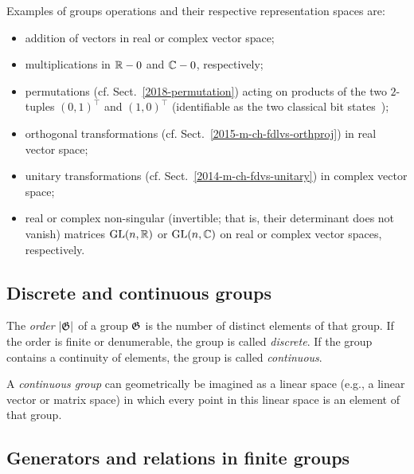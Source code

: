 {
\color{blue}
\bexample
Examples of groups operations and their respective representation spaces are:
\begin{itemize}
\item
addition of vectors in real or complex vector space;

\item
multiplications in ${\Bbb R} - {0}$ and ${\Bbb C} - {0}$, respectively;

\item
permutations (cf. Sect.~\ref{2018-permutation})
acting on products of the two $2$-tuples
$(0,1)^\intercal $ and
$(1,0)^\intercal $
(identifiable as the two classical bit states~\cite{mermin-07});


\item
orthogonal transformations
 (cf. Sect.~\ref{2015-m-ch-fdlvs-orthproj})
in real  vector space;

\item
unitary transformations
 (cf. Sect.~\ref{2014-m-ch-fdvs-unitary})
in  complex vector space;

\item
real or complex non-singular (invertible; that is, their determinant does not vanish)
matrices $\textrm{GL}(n,{\Bbb R})$ or $\textrm{GL}(n,{\Bbb C})$ on real or complex vector spaces, respectively.

\end{itemize}

\eexample
}


\subsection{Discrete and continuous groups}

The {\em order} $\vert {\frak G} \vert$ of a group ${\frak G}$ is the number of distinct elements of that group.
If the order is finite or denumerable, the group is called {\em discrete}.
If the group contains a continuity of elements, the group is called {\em continuous}.

A {\em continuous group} can geometrically be imagined as a linear  space  (e.g., a linear vector or matrix space)
in which every point in this linear space is an element of that group.




\subsection{Generators and relations in finite groups}


